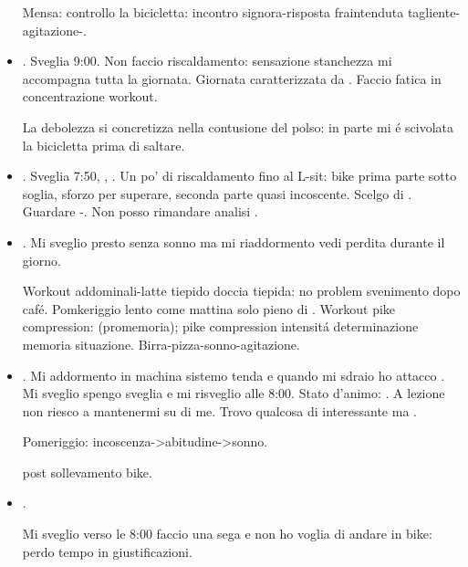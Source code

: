 \begin{itemize}
Mensa: controllo la bicicletta: incontro signora-risposta fraintenduta tagliente-agitazione-.

\item {}. Sveglia 9:00. Non faccio riscaldamento: sensazione stanchezza mi accompagna tutta la giornata. Giornata caratterizzata da . Faccio fatica in concentrazione workout.

La debolezza si concretizza nella contusione del polso: in parte mi \'e scivolata la bicicletta prima di saltare.

\item {}. Sveglia 7:50, , . Un po' di riscaldamento fino al L-sit: bike prima parte sotto soglia, sforzo per superare, seconda parte quasi incoscente. Scelgo di . Guardare -. Non posso rimandare analisi .

\item {}. Mi sveglio presto senza sonno ma mi riaddormento vedi perdita  durante il giorno. 

Workout addominali-latte tiepido doccia tiepida: no problem svenimento dopo caf\'e. Pomkeriggio lento come mattina solo pieno di . Workout pike compression:  (promemoria); pike compression intensit\'a determinazione memoria situazione. Birra-pizza-sonno-agitazione.

\item {}. Mi addormento in machina sistemo tenda e quando mi sdraio ho attacco . Mi sveglio spengo sveglia e mi risveglio alle 8:00. Stato d'animo: .
A lezione non riesco a mantenermi su di me. Trovo qualcosa di interessante ma . 

Pomeriggio: incoscenza->abitudine->sonno.

 post sollevamento bike.

\item {}. 

Mi sveglio verso le 8:00 faccio una sega e non ho voglia di andare in bike: perdo tempo in giustificazioni.


\end{itemize}
